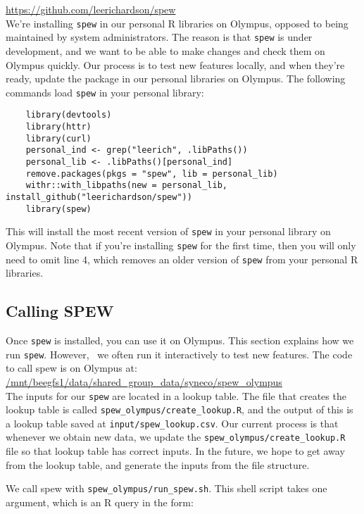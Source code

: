 \documentclass{article}
\begin{document}
\url{https://github.com/leerichardson/spew} \\

We're installing \verb|spew| in our personal R libraries on Olympus, opposed to being maintained by system administrators. The reason is that \verb|spew| is under development, and we want to be able to make changes and check them on Olympus quickly. Our process is to test new features locally, and when they're ready, update the package in our personal libraries on Olympus. The following commands load \verb|spew| in your personal library:

\begin{verbatim}
	library(devtools)
	library(httr)
	library(curl)
	personal_ind <- grep("leerich", .libPaths())
	personal_lib <- .libPaths()[personal_ind]
	remove.packages(pkgs = "spew", lib = personal_lib)
	withr::with_libpaths(new = personal_lib, install_github("leerichardson/spew"))
	library(spew)
\end{verbatim}	 

This will install the most recent version of \verb|spew| in your personal library on Olympus. Note that if you're installing \verb|spew| for the first time, then you will only need to omit line 4, which removes an older version of \verb|spew| from your personal R libraries. 

\subsection{Calling SPEW} 
Once \verb|spew| is installed, you can use it on Olympus. This section explains how we run \verb|spew|. However, \
we often run it interactively to test new features. The code to call spew is on Olympus at: \\

\url{/mnt/beegfs1/data/shared_group_data/syneco/spew_olympus} \\

The inputs for our \verb|spew| are located in a lookup table. The file that creates the lookup table is called \verb|spew_olympus/create_lookup.R|, and the output of this is a lookup table saved at \verb|input/spew_lookup.csv|. Our current process is that whenever we obtain new data, we update the \verb|spew_olympus/create_lookup.R| file so that lookup table has correct inputs. In the future, we hope to get away from the lookup table, and generate the inputs from the file structure. 

We call spew with \verb|spew_olympus/run_spew.sh|. This shell script takes one argument, which is an R query in the form:
\end{document}
